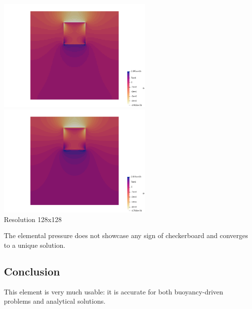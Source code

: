 \begin{center}
\includegraphics[width=7.7cm]{python_codes/fieldstone_80/results/block/p}
\includegraphics[width=7.7cm]{python_codes/fieldstone_80/results/block/q}\\
{\captionfont Resolution 128x128}
\end{center}
The elemental pressure does not showcase any sign of checkerboard and converges to a unique solution. 


\subsection*{Conclusion}

This element is very much usable: it is accurate for both buoyancy-driven problems and 
analytical solutions. 





